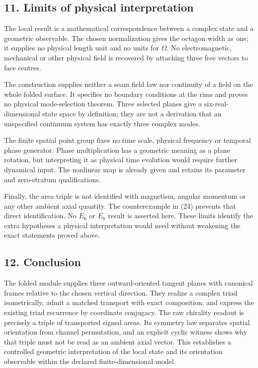 \documentclass[
  11pt,
  a4paper,
]{article}
\begin{document}
\subsection{11. Limits of physical interpretation}\label{limits-of-physical-interpretation}

The local result is a mathematical correspondence between a complex state and a geometric observable. The chosen normalization gives the octagon width as one; it supplies no physical length unit and no units for \(\Omega\). No electromagnetic, mechanical or other physical field is recovered by attaching three free vectors to face centres.

The construction supplies neither a seam field law nor continuity of a field on the whole folded surface. It specifies no boundary conditions at the rims and proves no physical mode-selection theorem. Three selected planes give a six-real-dimensional state space by definition; they are not a derivation that an unspecified continuum system has exactly three complex modes.

The finite spatial point group fixes no time scale, physical frequency or temporal phase generator. Phase multiplication has a geometric meaning as a plane rotation, but interpreting it as physical time evolution would require further dynamical input. The nonlinear map is already given and retains its parameter and zero-stratum qualifications.

Finally, the area triple is not identified with magnetism, angular momentum or any other ambient axial quantity. The counterexample in (24) prevents that direct identification. No \(E_6\) or \(E_8\) result is asserted here. These limits identify the extra hypotheses a physical interpretation would need without weakening the exact statements proved above.

\subsection{12. Conclusion}\label{conclusion}

The folded module supplies three outward-oriented tangent planes with canonical frames relative to the chosen vertical direction. They realize a complex triad isometrically, admit a matched transport with exact composition, and express the existing triad recurrence by coordinate conjugacy. The raw chirality readout is precisely a triple of transported signed areas. Its symmetry law separates spatial orientation from channel permutation, and an explicit cyclic witness shows why that triple must not be read as an ambient axial vector. This establishes a controlled geometric interpretation of the local state and its orientation observable within the declared finite-dimensional model.
\end{document}
